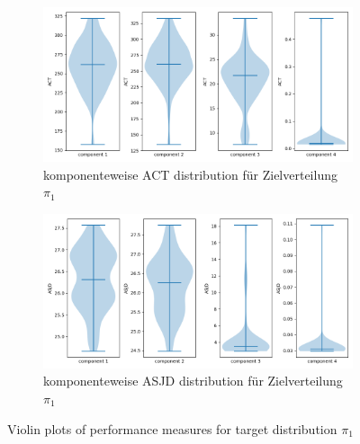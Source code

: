 \documentclass{scrartcl}
\begin{document}
    \begin{figure}
        \centering
        \begin{subfigure}{0.45\textheight}
              \centering
              \includegraphics[width=.8\linewidth]{../figs/ACT_pi_1.png}
              \caption{komponenteweise ACT distribution für Zielverteilung $\pi_1$}
              \label{violin_plots_pi_1_act}
        \end{subfigure}
        \begin{subfigure}{0.45\textheight}
              \centering
              \includegraphics[width=.8\linewidth]{../figs/ASJD_pi_1.png}
              \caption{komponenteweise ASJD distribution für Zielverteilung $\pi_1$}
              \label{violin_plots_pi_1_asjd}
        \end{subfigure}
        \caption{Violin plots of performance measures for target distribution $\pi_1$}
        \label{violin_plots_pi_1}
    \end{figure}
\end{document}
